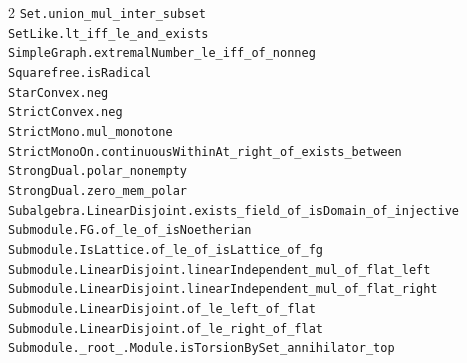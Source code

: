 \documentclass[10pt,a4paper]{article}
\begin{document}
\begin{multicols}{2}
\texttt{Set.\allowbreak{}union\_mul\_inter\_subset} \\
\texttt{SetLike.\allowbreak{}lt\_iff\_le\_and\_exists} \\
\texttt{SimpleGraph.\allowbreak{}extremalNumber\_le\_iff\_of\_nonneg} \\
\texttt{Squarefree.\allowbreak{}isRadical} \\
\texttt{StarConvex.\allowbreak{}neg} \\
\texttt{StrictConvex.\allowbreak{}neg} \\
\texttt{StrictMono.\allowbreak{}mul\_monotone} \\
\texttt{StrictMonoOn.\allowbreak{}continuousWithinAt\_right\_of\_exists\_between} \\
\texttt{StrongDual.\allowbreak{}polar\_nonempty} \\
\texttt{StrongDual.\allowbreak{}zero\_mem\_polar} \\
\texttt{Subalgebra.\allowbreak{}LinearDisjoint.\allowbreak{}exists\_field\_of\_isDomain\_of\_injective} \\
\texttt{Submodule.\allowbreak{}FG.\allowbreak{}of\_le\_of\_isNoetherian} \\
\texttt{Submodule.\allowbreak{}IsLattice.\allowbreak{}of\_le\_of\_isLattice\_of\_fg} \\
\texttt{Submodule.\allowbreak{}LinearDisjoint.\allowbreak{}linearIndependent\_mul\_of\_flat\_left} \\
\texttt{Submodule.\allowbreak{}LinearDisjoint.\allowbreak{}linearIndependent\_mul\_of\_flat\_right} \\
\texttt{Submodule.\allowbreak{}LinearDisjoint.\allowbreak{}of\_le\_left\_of\_flat} \\
\texttt{Submodule.\allowbreak{}LinearDisjoint.\allowbreak{}of\_le\_right\_of\_flat} \\
\texttt{Submodule.\allowbreak{}\_root\_.\allowbreak{}Module.\allowbreak{}isTorsionBySet\_annihilator\_top} \\

\end{multicols}
\end{document}
